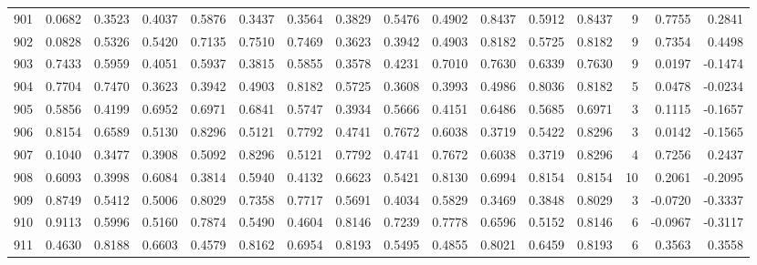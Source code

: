 \begin{tabular}{lrrrrrrrrrrrrrrr}
901 &      0.0682 &  0.3523 &  0.4037 &  0.5876 &  0.3437 &  0.3564 &  0.3829 &  0.5476 &  0.4902 &  0.8437 &   0.5912 &     0.8437 &      9 &                    0.7755 &                     0.2841 \\
902 &      0.0828 &  0.5326 &  0.5420 &  0.7135 &  0.7510 &  0.7469 &  0.3623 &  0.3942 &  0.4903 &  0.8182 &   0.5725 &     0.8182 &      9 &                    0.7354 &                     0.4498 \\
903 &      0.7433 &  0.5959 &  0.4051 &  0.5937 &  0.3815 &  0.5855 &  0.3578 &  0.4231 &  0.7010 &  0.7630 &   0.6339 &     0.7630 &      9 &                    0.0197 &                    -0.1474 \\
904 &      0.7704 &  0.7470 &  0.3623 &  0.3942 &  0.4903 &  0.8182 &  0.5725 &  0.3608 &  0.3993 &  0.4986 &   0.8036 &     0.8182 &      5 &                    0.0478 &                    -0.0234 \\
905 &      0.5856 &  0.4199 &  0.6952 &  0.6971 &  0.6841 &  0.5747 &  0.3934 &  0.5666 &  0.4151 &  0.6486 &   0.5685 &     0.6971 &      3 &                    0.1115 &                    -0.1657 \\
906 &      0.8154 &  0.6589 &  0.5130 &  0.8296 &  0.5121 &  0.7792 &  0.4741 &  0.7672 &  0.6038 &  0.3719 &   0.5422 &     0.8296 &      3 &                    0.0142 &                    -0.1565 \\
907 &      0.1040 &  0.3477 &  0.3908 &  0.5092 &  0.8296 &  0.5121 &  0.7792 &  0.4741 &  0.7672 &  0.6038 &   0.3719 &     0.8296 &      4 &                    0.7256 &                     0.2437 \\
908 &      0.6093 &  0.3998 &  0.6084 &  0.3814 &  0.5940 &  0.4132 &  0.6623 &  0.5421 &  0.8130 &  0.6994 &   0.8154 &     0.8154 &     10 &                    0.2061 &                    -0.2095 \\
909 &      0.8749 &  0.5412 &  0.5006 &  0.8029 &  0.7358 &  0.7717 &  0.5691 &  0.4034 &  0.5829 &  0.3469 &   0.3848 &     0.8029 &      3 &                   -0.0720 &                    -0.3337 \\
910 &      0.9113 &  0.5996 &  0.5160 &  0.7874 &  0.5490 &  0.4604 &  0.8146 &  0.7239 &  0.7778 &  0.6596 &   0.5152 &     0.8146 &      6 &                   -0.0967 &                    -0.3117 \\
911 &      0.4630 &  0.8188 &  0.6603 &  0.4579 &  0.8162 &  0.6954 &  0.8193 &  0.5495 &  0.4855 &  0.8021 &   0.6459 &     0.8193 &      6 &                    0.3563 &                     0.3558 \\

\end{tabular}
